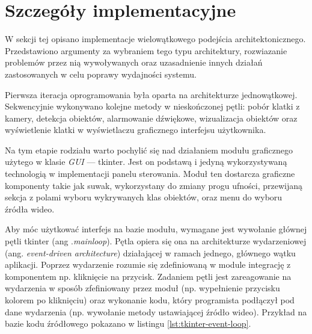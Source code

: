 \section{Szczegóły implementacyjne}
W sekcji tej opisano implementacje wielowątkowego podejścia architektonicznego. Przedstawiono argumenty za wybraniem tego typu architektury, rozwiazanie problemów przez nią wywoływanych oraz uzasadnienie innych działań zastosowanych w celu poprawy wydajności systemu.  

Pierwsza iteracja oprogramowania była oparta na architekturze jednowątkowej. Sekwencyjnie wykonywano kolejne metody w nieskończonej pętli: pobór klatki z kamery, detekcja obiektów, alarmowanie dźwiękowe, wizualizacja obiektów oraz wyświetlenie klatki w wyświetlaczu graficznego interfejsu użytkownika.

Na tym etapie rodziału warto pochylić się nad działaniem modułu graficznego użytego w klasie \emph{GUI} --- tkinter. 
Jest on podstawą i jedyną wykorzystywaną technologią w implementacji panelu sterowania. Moduł ten dostarcza graficzne komponenty takie jak suwak, wykorzystany do zmiany progu ufności, przewijaną sekcja z polami wyboru wykrywanych klas obiektów, oraz menu do wyboru źródła wideo. 

Aby móc użytkować interfejs na bazie modułu, wymagane jest wywołanie głównej pętli tkinter (ang .\emph{mainloop}). Pętla opiera się ona na architekturze wydarzeniowej (ang. \emph{event-driven architecture}) działającej w ramach jednego, głównego wątku aplikacji. Poprzez wydarzenie rozumie się zdefiniowaną w module integrację z komponentem np. kliknięcie na przycisk. Zadaniem pętli jest zareagowanie na wydarzenia w sposób zfefiniowany przez moduł (np. wypełnienie przycisku kolorem po kliknięciu) oraz wykonanie kodu, który programista podłączył pod dane wydarzenia (np. wywołanie metody ustawiającej źródło wideo). Przykład na bazie kodu źródłowego pokazano w listingu \ref{lst:tkinter-event-loop}.


